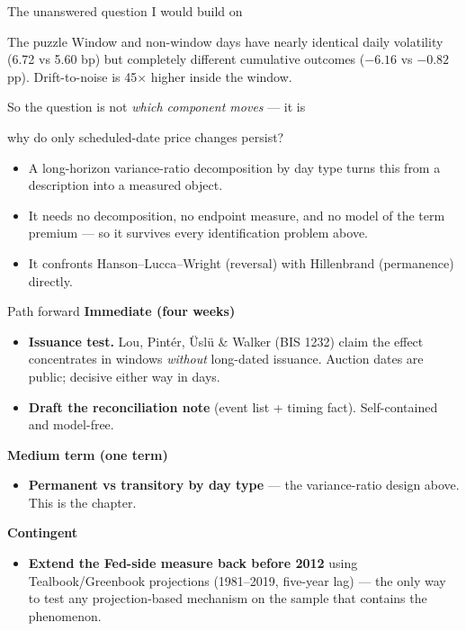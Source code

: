 \documentclass[11pt,aspectratio=169]{beamer}
\begin{document}
\begin{frame}{The unanswered question I would build on}
\begin{block}{The puzzle}
Window and non-window days have nearly identical daily volatility (6.72 vs 5.60 bp) but completely different cumulative outcomes ($-6.16$ vs $-0.82$ pp). Drift-to-noise is \alert{45$\times$} higher inside the window.
\end{block}
\vspace{0.2em}
So the question is not \emph{which component moves} --- it is
\begin{center}
\alert{\large why do only scheduled-date price changes persist?}
\end{center}
\vspace{0.1em}
\small
\begin{itemize}\setlength\itemsep{0.15em}
  \item A long-horizon variance-ratio decomposition by day type turns this from a description into a measured object.
  \item It needs no decomposition, no endpoint measure, and no model of the term premium --- so it survives every identification problem above.
  \item It confronts Hanson--Lucca--Wright (reversal) with Hillenbrand (permanence) directly.
\end{itemize}
\end{frame}

\begin{frame}{Path forward}
\small
\textbf{Immediate (four weeks)}
\begin{itemize}\setlength\itemsep{0.1em}
  \item[(a)] \textbf{Issuance test.} Lou, Pint\'er, \"Usl\"u \& Walker (BIS 1232) claim the effect concentrates in windows \emph{without} long-dated issuance. Auction dates are public; decisive either way in days.
  \item[(b)] \textbf{Draft the reconciliation note} (event list + timing fact). Self-contained and model-free.
\end{itemize}
\vspace{0.4em}
\textbf{Medium term (one term)}
\begin{itemize}
  \item[(c)] \textbf{Permanent vs transitory by day type} --- the variance-ratio design above. This is the chapter.
\end{itemize}
\vspace{0.4em}
\textbf{Contingent}
\begin{itemize}
  \item[(d)] \textbf{Extend the Fed-side measure back before 2012} using Tealbook/Greenbook projections (1981--2019, five-year lag) --- the only way to test any projection-based mechanism on the sample that contains the phenomenon.
\end{itemize}
\end{frame}
\end{document}
